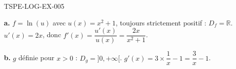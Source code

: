\begin{corrige}{TSPE-LOG-EX-005}

\textbf{a.} $f = \ln(u)$ avec $u(x)=x^2+1$, toujours strictement positif : $D_f = \mathbb{R}$. $u'(x)=2x$, donc $f'(x) = \dfrac{u'(x)}{u(x)} = \dfrac{2x}{x^2+1}$.

\textbf{b.} $g$ définie pour $x>0$ : $D_g = ]0,+\infty[$. $g'(x) = 3 \times \dfrac{1}{x} - 1 = \dfrac{3}{x} - 1$.

\end{corrige}

